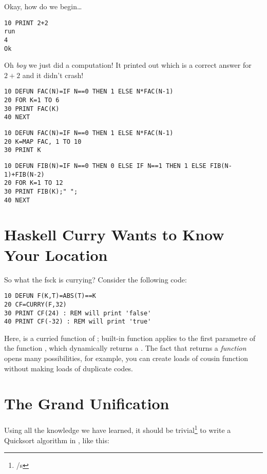 Okay, how do we begin\ldots

\begin{lstlisting}
10 PRINT 2+2
run
4
Ok
\end{lstlisting}

Oh \emph{boy} we just did a computation! It printed out  which is a correct answer for $2+2$ and it didn't crash!

\begin{lstlisting}
10 DEFUN FAC(N)=IF N==0 THEN 1 ELSE N*FAC(N-1)
20 FOR K=1 TO 6
30 PRINT FAC(K)
40 NEXT
\end{lstlisting}

\begin{lstlisting}
10 DEFUN FAC(N)=IF N==0 THEN 1 ELSE N*FAC(N-1)
20 K=MAP FAC, 1 TO 10
30 PRINT K
\end{lstlisting}


\begin{lstlisting}
10 DEFUN FIB(N)=IF N==0 THEN 0 ELSE IF N==1 THEN 1 ELSE FIB(N-1)+FIB(N-2)
20 FOR K=1 TO 12
30 PRINT FIB(K);" ";
40 NEXT
\end{lstlisting}

\section[Currying]{Haskell Curry Wants to Know Your Location}

So what the fsck is currying? Consider the following code:

\begin{lstlisting}
10 DEFUN F(K,T)=ABS(T)==K
20 CF=CURRY(F,32)
30 PRINT CF(24) : REM will print 'false'
40 PRINT CF(-32) : REM will print 'true'
\end{lstlisting}

Here,  is a curried function of ; built-in function  applies  to the first parametre of the function , which dynamically returns a  . The fact that  returns a \emph{function} opens many possibilities, for example, you can create loads of cousin function without making loads of duplicate codes.

\section[Wrapping-Up]{The Grand Unification}

Using all the knowledge we have learned, it should be trivial\footnote{/s} to write a Quicksort algorithm in \tbas, like this:

